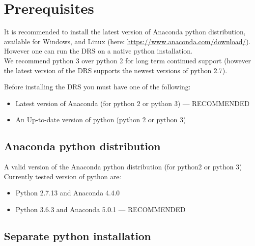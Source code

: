 \clearpage
\newpage
\section{Prerequisites}
\label{ch:install:prerequisites}

It is recommended to install the latest version of Anaconda python distribution, available for Windows, \mac and Linux (here: \url{https://www.anaconda.com/download/}). However one can run the DRS on a native python installation. \\

\noindent We recommend python 3 over python 2 for long term continued support (however the latest version of the DRS supports the newest versions of python 2.7).

\begin{note}
Before installing the DRS you must have one of the following:
\begin{itemize}
\item Latest version of Anaconda (for python 2 or python 3) --- RECOMMENDED
\item An Up-to-date version of python (python 2 or python 3)
\end{itemize}
\end{note}


\subsection{Anaconda python distribution}
\label{ch:install:prerequisites:anaconda}

A valid version of the Anaconda python distribution (for python2 or python 3)
\noindent Currently tested version of python are:
\begin{itemize}
\item Python 2.7.13 and Anaconda 4.4.0
\item Python 3.6.3 and Anaconda 5.0.1 --- RECOMMENDED
\end{itemize}



\subsection{Separate python installation}
\label{ch:install:prerequisites:separate_python}

